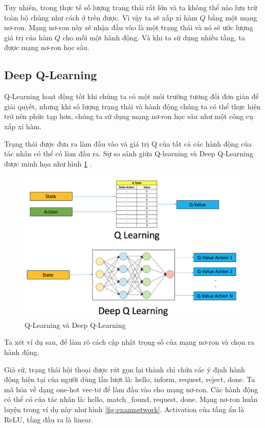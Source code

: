 Tuy nhiên, trong thực tế số lượng trạng thái rất lớn và ta không thể
nào lưu trữ toàn bộ chúng như cách ở trên được. Vì vậy ta sẽ xấp xỉ
hàm $Q$ bằng một mạng nơ-ron. Mạng nơ-ron này sẽ nhận đầu vào là một
trạng thái và nó sẽ ước lượng giá trị của hàm $Q$ cho mỗi một
hành động. Và khi ta sử dụng nhiều tầng, ta được mạng nơ-ron học sâu.

\subsection{Deep Q-Learning}
\label{subsec:deepqlearning}
Q-Learning hoạt động tốt khi chúng ta có một môi trường tương đối
đơn giản để giải quyết, nhưng khi số lượng trạng thái và hành động
chúng ta có thể thực hiện trở nên phức tạp hơn, chúng ta sử dụng
mạng nơ-ron học sâu như một công cụ xấp xỉ hàm.

Trạng thái được đưa ra làm đầu vào và giá trị Q của tất cả các
hành động của tác nhân có thể có làm đầu ra. Sự so sánh giữa
Q-learning và Deep Q-Learning được minh họa như hình
\ref{fig:dqlearning} \cite{introductiondeepqlearningpython}.

\begin{figure}[ht!]
    \centering
    \includegraphics[scale=0.27]{thesis/chatbot/kienthuc/img/dqlearning.png}
    \caption{Q-Learning và Deep Q-Learning}
    \label{fig:dqlearning}
\end{figure}

Ta xét ví dụ sau, để làm rõ cách cập nhật trọng số của mạng nơ-ron
và chọn ra hành động.

Giả sử, trạng thái hội thoại được rút gọn lại thành chỉ chứa các
ý định hành động hiện tại của người dùng lần lượt là: hello, inform,
request, reject, done. Ta mã hóa về dạng one-hot vec-tơ để làm
đầu vào cho mạng nơ-ron. Các hành động có thể có của tác nhân là:
hello, match\_found, request, done. Mạng nơ-ron huấn luyện trong
ví dụ này như hình \ref{fig:examnetwork}. Activation của tầng ẩn là
ReLU, tầng đầu ra là linear.

